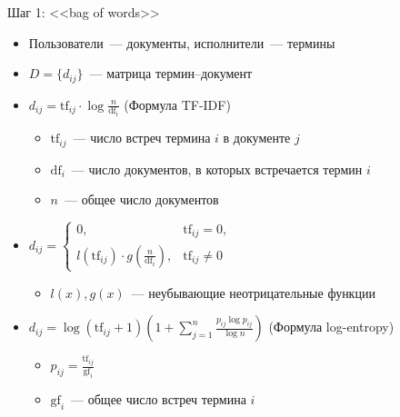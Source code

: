 \documentclass{beamer}
\begin{document}
\begin{frame}{Шаг 1: <<bag of words>>}
  \begin{itemize}
      \item {Пользователи~--- документы, исполнители~--- термины}
      \item {$D = \{d_{ij}\}$~--- матрица термин--документ}
      \item {$d_{ij} = \mathrm{tf}_{ij} \cdot \log{\frac{n}{\mathrm{df}_{i}}}$ (Формула TF-IDF)}
          \begin{itemize}
              \item $\mathrm{tf}_{ij}$~--- число встреч термина $i$ в документе $j$
              \item $\mathrm{df}_{i}$~--- число документов, в которых встречается термин $i$
              \item $n$~--- общее число документов
          \end{itemize}
      \item {$d_{ij} = \begin{cases}
          0,& \mathrm{tf}_{ij} = 0,\\
          l(\mathrm{tf}_{ij}) \cdot g(\frac{n}{\mathrm{df}_{i}}),& \mathrm{tf}_{ij} \ne 0
      \end{cases}$}
          \begin{itemize}
              \item {$l(x), g(x)$~--- неубывающие неотрицательные функции}
          \end{itemize}
      \item {$ 
          d_{ij} = \log{(\mathrm{tf}_{ij} + 1)} 
          (1 + \sum_{j=1}^{n} \frac{p_{ij} \log{p_{ij}}}{\log{n}})
$ (Формула log-entropy)}
          \begin{itemize}
              \item {$p_{ij} = \frac{\mathrm{tf}_{ij}}{\mathrm{gf}_i}$}
              \item {$\mathrm{gf}_i$~--- общее число встреч термина $i$}
          \end{itemize}
  \end{itemize}
\end{frame}
\end{document}
